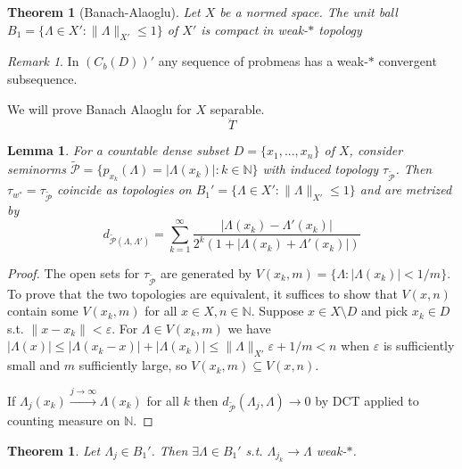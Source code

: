 \documentclass{article}
\theoremstyle{definition}
\theoremstyle{remark}
\newtheorem{rem}{Remark}
\theoremstyle{plain}
\newtheorem{lem}[defn]{Lemma}
\newtheorem{thm}[defn]{Theorem}
\newcommand{\NN}{\mathbb{N}}
\begin{document}
\begin{thm}[Banach-Alaoglu]
    Let $X$ be a normed space. The unit ball $B_1=\{\Lambda\in X':\|\Lambda\|_{X'}\le 1\}$ of $X'$ is compact in weak-$\ast$ topology
\end{thm}
\begin{rem}
    In $(C_b(D))'$ any sequence of probmeas has a weak-$\ast$ convergent subsequence.
\end{rem}
We will prove Banach Alaoglu for $X$ separable.
\[\ddot{T}\tag{Owen's Signature}\]
\begin{lem}
    For a countable dense subset $D=\{x_1,...,x_n\}$ of $X$, consider seminorms $\tilde{\mathcal{P}}=\{p_{x_k}(\Lambda)=|\Lambda(x_k)|:k\in\NN\}$ with induced topology $\tau_{\tilde{\mathcal P}}$. Then $\tau_{w^*}=\tau_{\tilde{\mathcal P}}$ coincide as topologies on $B_1'=\{\Lambda\in X':\|\Lambda\|_{X'}\le 1\}$ and are metrized by
    \[d_{\tilde{\mathcal P}(\Lambda,\Lambda')}=\sum_{k=1}^\infty \dfrac{|\Lambda(x_k)-\Lambda'(x_k)|}{2^k(1+|\Lambda(x_k)+\Lambda'(x_k)|)}\]
\end{lem}
\begin{proof}
    The open sets for $\tau_{\tilde{\mathcal P}}$ are generated by $V(x_k,m)=\{\Lambda:|\Lambda(x_k)|<1/m\}$. To prove that the two topologies are equivalent, it suffices to show that $V(x,n)$ contain some $V(x_k,m)$ for all $x\in X,n\in\NN$. Suppose $x\in X\setminus D$ and pick $x_k\in D$ s.t. $\|x-x_k\|<\varepsilon$. For $\Lambda\in V(x_k,m)$ we have $|\Lambda(x)|\le|\Lambda(x_k-x)|+|\Lambda(x_k)|\le\|\Lambda\|_{X'}\varepsilon+1/m<n$ when $\varepsilon$ is sufficiently small and $m$ sufficiently large, so $V(x_k,m)\subseteq V(x,n)$.

    If $\Lambda_j(x_k)\overset{j\to\infty}{\longrightarrow}\Lambda(x_k)$ for all $k$ then $d_{\tilde{\mathcal P}}(\Lambda_j,\Lambda)\to 0$ by DCT applied to counting measure on $\NN$.
\end{proof}
\begin{thm}
    Let $\Lambda_j\in B_1'$. Then $\exists\Lambda\in B_1'$ s.t. $\Lambda_{j_k}\to\Lambda$ weak-$\ast$.
\end{thm}
\end{document}
